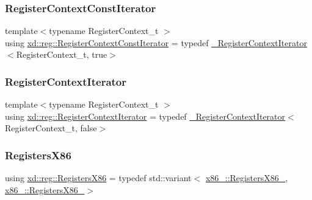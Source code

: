 \mbox{\label{namespacexd_1_1reg_a2af91c639cf4f8e0907c20f2ac534965}} 
\subsubsection{\texorpdfstring{Register\+Context\+Const\+Iterator}{RegisterContextConstIterator}}
{\footnotesize\ttfamily template$<$typename Register\+Context\+\_\+t $>$ \\
using \mbox{\hyperlink{namespacexd_1_1reg_a2af91c639cf4f8e0907c20f2ac534965}{xd\+::reg\+::\+Register\+Context\+Const\+Iterator}} = typedef \mbox{\hyperlink{classxd_1_1reg_1_1___register_context_iterator}{\+\_\+\+Register\+Context\+Iterator}}$<$Register\+Context\+\_\+t, true$>$}

\mbox{\label{namespacexd_1_1reg_a6cf4cf0ab5273eb69f6aa3fd40dcc1de}} 
\subsubsection{\texorpdfstring{Register\+Context\+Iterator}{RegisterContextIterator}}
{\footnotesize\ttfamily template$<$typename Register\+Context\+\_\+t $>$ \\
using \mbox{\hyperlink{namespacexd_1_1reg_a6cf4cf0ab5273eb69f6aa3fd40dcc1de}{xd\+::reg\+::\+Register\+Context\+Iterator}} = typedef \mbox{\hyperlink{classxd_1_1reg_1_1___register_context_iterator}{\+\_\+\+Register\+Context\+Iterator}}$<$Register\+Context\+\_\+t, false$>$}

\mbox{\label{namespacexd_1_1reg_a0c10a4d10e689bc16f6f1a8feb4fb9b8}} 
\subsubsection{\texorpdfstring{Registers\+X86}{RegistersX86}}
{\footnotesize\ttfamily using \mbox{\hyperlink{namespacexd_1_1reg_a0c10a4d10e689bc16f6f1a8feb4fb9b8}{xd\+::reg\+::\+Registers\+X86}} = typedef std\+::variant$<$ \mbox{\hyperlink{namespacexd_1_1reg_1_1x86__32_a28d948c5cde56fbf4f6ea71cea3d595b}{x86\+\_\+::\+Registers\+X86\+\_}}, \mbox{\hyperlink{namespacexd_1_1reg_1_1x86__64_a3a7f77ab982b8a5833111da7ceccafeb}{x86\+\_\+::\+Registers\+X86\+\_}}$>$}

